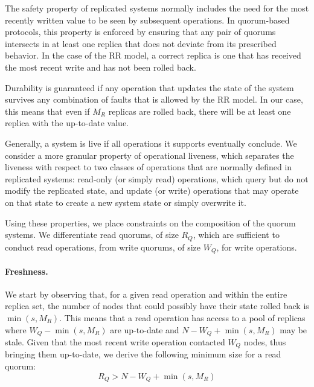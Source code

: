 \begin{property}[Freshness]
    The safety property of replicated systems normally includes
    the need for the most recently written value to be seen by
    subsequent operations. In quorum-based protocols, this
    property is enforced by ensuring that any pair of quorums
    intersects in at least one replica that does not deviate from
    its prescribed behavior. In the case of the \ac{RR} model, a
    correct replica is one that has received the most recent
    write and has not been rolled back.
\end{property}


\begin{property}[Durability]
    Durability is guaranteed if any operation that updates the
    state of the system survives any combination of faults that
    is allowed by the \ac{RR} model. In our case, this means that
    even if $M_R$ replicas are rolled back, there will be at
    least one replica with the up-to-date value.
\end{property}

\begin{property}
    Generally, a system is live if all operations it supports eventually
    conclude.  We consider a more granular property of operational
    liveness, which separates the liveness with respect to two classes
    of operations that are normally defined in replicated systems:
    read-only (or simply read) operations, which query but do not modify
    the replicated state, and update (or write) operations that may
    operate on that state to create a new system state or simply overwrite
    it.
\end{property}

Using these properties, we place constraints on the
composition of the quorum systems. We differentiate
read quorums, of size $R_Q$, which are sufficient to conduct read operations,
from write quorums, of size $W_Q$, for write operations.

\paragraph{Freshness.}

We start by observing that, for a given read operation and within
the entire replica set, the number of nodes that could possibly
have their state rolled back is $\min(s, M_R)$. This means that a
read operation has access to a pool of replicas where $W_Q -
\min(s, M_R)$ are up-to-date and $N - W_Q + \min(s, M_R)$ may be
stale. Given that the most recent write operation contacted $W_Q$
nodes, thus bringing them up-to-date, we derive the following
minimum size for a read quorum:
\begin{equation} \label{eq:inters}
  R_Q > N - W_Q + \min(s, M_R)
\end{equation}

